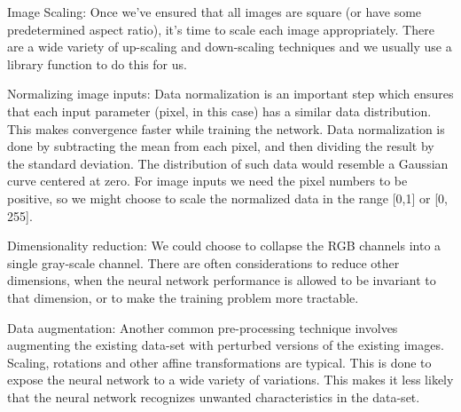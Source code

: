 \documentclass[../main.tex]{subfiles}
\begin{document}


Image Scaling: Once we’ve ensured that all images are square (or have some predetermined aspect ratio), it’s time to scale each image appropriately. There are a wide variety of up-scaling and down-scaling techniques and we usually use a library function to do this for us.


Normalizing image inputs: Data normalization is an important step which ensures that each input parameter (pixel, in this case) has a similar data distribution. This makes convergence faster while training the network. Data normalization is done by subtracting the mean from each pixel, and then dividing the result by the standard deviation. The distribution of such data would resemble a Gaussian curve centered at zero. For image inputs we need the pixel numbers to be positive, so we might choose to scale the normalized data in the range [0,1] or [0, 255]. 

Dimensionality reduction: We could choose to collapse the RGB channels into a single gray-scale channel. There are often considerations to reduce other dimensions, when the neural network performance is allowed to be invariant to that dimension, or to make the training problem more tractable.


Data augmentation: Another common pre-processing technique involves augmenting the existing data-set with perturbed versions of the existing images. Scaling, rotations and other affine transformations are typical. This is done to expose the neural network to a wide variety of variations. This makes it less likely that the neural network recognizes unwanted characteristics in the data-set.
\cite{multi}
\vspace{5mm}
\end{document}
